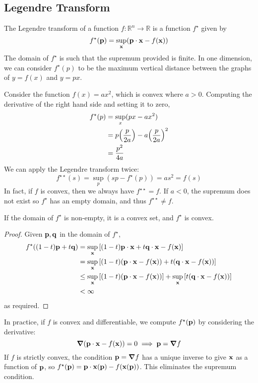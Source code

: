 \subsection{Legendre Transform}
\begin{definition}
    The Legendre transform of a function \( f \colon \mathbb R^n \to \mathbb R \) is a function \( f^\star \) given by
    \[ f^\star(\vb p) = \sup_{\vb x} (\vb p \cdot \vb x - f(\vb x)) \]
    The domain of \( f^\star \) is such that the supremum provided is finite.
    In one dimension, we can consider \( f^\star(p) \) to be the maximum vertical distance between the graphs of \( y = f(x) \) and \( y = px \).
\end{definition}
\begin{example}
    Consider the function \( f(x) = ax^2 \), which is convex where \( a > 0 \).
    Computing the derivative of the right hand side and setting it to zero,
    \begin{align*}
        f^\star(p) &= \sup_x (px - ax^2) \\
        &= p\qty(\frac{p}{2a}) - a \qty(\frac{p}{2a})^2 \\
        &= \frac{p^2}{4a}
    \end{align*}
    We can apply the Legendre transform twice:
    \[ f^{\star\star}(s) = \sup_p (sp - f^\star(p)) = as^2 = f(s) \]
    In fact, if \( f \) is convex, then we always have \( f^{\star\star} = f \).
    If \( a < 0 \), the supremum does not exist so \( f^\star \) has an empty domain, and thus \( f^{\star\star} \neq f \).
\end{example}
\begin{proposition}
    If the domain of \( f^\star \) is non-empty, it is a convex set, and \( f^\star \) is convex.
\end{proposition}
\begin{proof}
    Given \( \vb p, \vb q \) in the domain of \( f^\star \),
    \begin{align*}
        f^\star((1-t)\vb p + t \vb q) &= \sup_{\vb x} \qty[(1-t)\vb p \cdot \vb x + t \vb q \cdot \vb x - f(\vb x)] \\
        &= \sup_{\vb x} \qty[(1-t)(\vb p \cdot \vb x - f(\vb x)) + t (\vb q \cdot \vb x - f(\vb x))] \\
        &\leq \sup_{\vb x} \qty[(1-t)(\vb p \cdot \vb x - f(\vb x))] + \sup_{\vb x} \qty[t (\vb q \cdot \vb x - f(\vb x))] \\
        &< \infty
    \end{align*}
    as required.
\end{proof}

\noindent In practice, if \( f \) is convex and differentiable, we compute \( f^\star(\vb p) \) by considering the derivative:
\[ \grad(\vb p \cdot \vb x - f(\vb x)) = 0 \implies \vb p = \grad{f} \]
If \( f \) is strictly convex, the condition \( \vb p = \grad{f} \) has a unique inverse to give \( \vb x \) as a function of \( \vb p \), so \( f^\star(\vb p) = \vb p \cdot \vb x(\vb p) - f(\vb x(\vb p)) \).
This eliminates the supremum condition.
